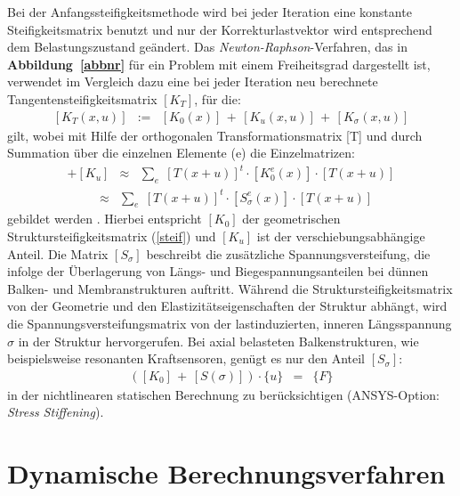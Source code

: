 Bei der Anfangssteifigkeitsmethode wird bei jeder
Iteration eine konstante Steifigkeitsmatrix benutzt und nur der
Korrekturlastvektor wird entsprechend dem Belastungszustand geändert.
Das {\sl Newton-Raphson}-Verfahren, das in {\bf Abbildung~\ref{abbnr}}
für ein Problem mit einem Freiheitsgrad dargestellt ist, verwendet im
Vergleich dazu eine bei jeder Iteration neu berechnete
Tangentensteifigkeitsmatrix $[K_{T}]$, für die:
\begin{eqnarray}
\label{tangentenmatrix}
  [K_{T}(x,u)] & := &  [K_{0}(x)] \, + \, [K_{u}(x,u)] \, + \,
                       [K_{\sigma}(x,u)]
\end{eqnarray}
gilt, wobei mit Hilfe der orthogonalen Transformationsmatrix [T] und durch
Summation über die einzelnen Elemente (e) die Einzelmatrizen:
\begin{eqnarray*}
 [K_{0}] + [K_{u}] & \approx &
   \sum_{e} \; [T(x+u)]^{t} \cdot [K_{0}^{e}(x)] \cdot [T(x+u)]
\end{eqnarray*}
\begin{eqnarray*}
 [K_{\sigma}] & \approx &
     \sum_{e} \; [T(x+u)]^{t} \cdot [S_{\sigma}^{e}(x)] \cdot [T(x+u)]
\end{eqnarray*}
gebildet werden \cite{Mat93}. Hierbei entspricht $[K_{0}]$
der geometrischen Struktursteifigkeitsmatrix (\ref{steif})
und $[K_{u}]$ ist der verschiebungsabhängige Anteil. Die Matrix
$[S_{\sigma}]$ beschreibt die zusätzliche Spannungsversteifung, die
infolge der Überlagerung von Längs- und
Biegespannungsanteilen bei dünnen Balken- und Membranstrukturen auftritt.
Während die Struktursteifigkeitsmatrix von der Geometrie und den
Elastizitätseigenschaften der Struktur abhängt, wird die
Spannungsversteifungsmatrix von der lastinduzierten, inneren Längsspannung
$\sigma$ in der Struktur hervorgerufen. Bei axial belasteten
Balkenstrukturen, wie beispielsweise resonanten Kraftsensoren,
genügt es nur den Anteil $[S_{\sigma}]$:
\begin{eqnarray}
\label{sstif}
 ([K_{0}] \, + \, [S(\sigma)]) \cdot \{u\} & = & \{F\}
\end{eqnarray}
in der nichtlinearen statischen Berechnung zu berücksichtigen
({\sf ANSYS}-Option: {\em Stress Stiffening}).



\section{Dynamische Berechnungsverfahren}
\label{dynamik}

